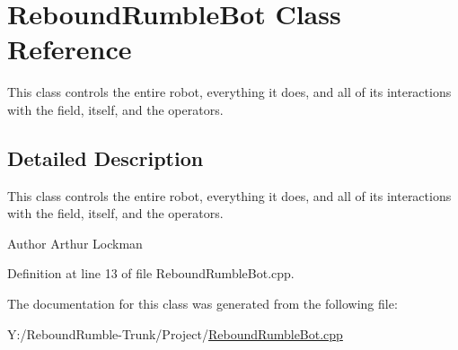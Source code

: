 \hypertarget{class_rebound_rumble_bot}{\section{\-Rebound\-Rumble\-Bot \-Class \-Reference}
\label{class_rebound_rumble_bot}
}


\-This class controls the entire robot, everything it does, and all of its interactions with the field, itself, and the operators.  




\subsection{\-Detailed \-Description}
\-This class controls the entire robot, everything it does, and all of its interactions with the field, itself, and the operators. 

\begin{DoxyAuthor}{\-Author}
\-Arthur \-Lockman 
\end{DoxyAuthor}


\-Definition at line 13 of file \-Rebound\-Rumble\-Bot.\-cpp.



\-The documentation for this class was generated from the following file\-:\begin{DoxyCompactItemize}
\item 
\-Y\-:/\-Rebound\-Rumble-\/\-Trunk/\-Project/\hyperlink{_rebound_rumble_bot_8cpp}{\-Rebound\-Rumble\-Bot.\-cpp}\end{DoxyCompactItemize}
